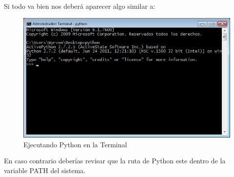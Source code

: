 Si todo va bien nos deberá aparecer algo similar a:

\begin{figure}[h]
    \centering
    \includegraphics[scale=0.7]{resourse/consola-python.jpg}
    \caption{Ejecutando Python en la Terminal}
    \label{fig:01}
\end{figure}    

En caso contrario deberías revisar que la ruta de Python este dentro de la variable  PATH del sistema.




